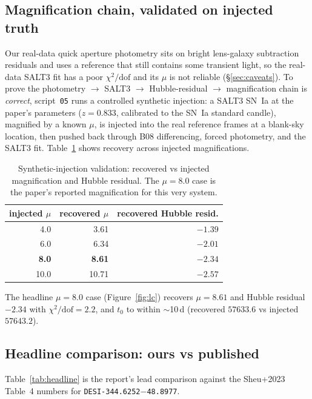 \documentclass[11pt,letterpaper]{article}
\newcommand{\muamp}{\ensuremath{\mu}}
\newcommand{\target}{\texttt{DESI-344.6252$-$48.8977}}
\begin{document}
\subsection{Magnification chain, validated on injected truth}
\label{sec:synth}
Our real-data quick aperture photometry sits on bright lens-galaxy
subtraction residuals and uses a reference that still contains some
transient light, so the real-data SALT3 fit has a poor $\chi^2/\mathrm{dof}$
and its $\muamp$ is not reliable (\S\ref{sec:caveats}). To prove the
photometry $\to$ SALT3 $\to$ Hubble-residual $\to$ magnification chain is
\emph{correct}, script~\texttt{05} runs a controlled synthetic injection: a
SALT3 SN~Ia at the paper's parameters ($z=0.833$, calibrated to the SN~Ia
standard candle), magnified by a known $\muamp$, is injected into the real
reference frames at a blank-sky location, then pushed back through B08
differencing, forced photometry, and the SALT3 fit. Table~\ref{tab:synth}
shows recovery across injected magnifications.

\begin{table}[ht]
\centering
\caption{Synthetic-injection validation: recovered vs injected
magnification and Hubble residual. The $\muamp=8.0$ case is the paper's
reported magnification for this very system.}
\label{tab:synth}
\begin{tabular}{rrr}
\toprule
injected $\muamp$ & recovered $\muamp$ & recovered Hubble resid. \\
\midrule
4.0          & 3.61          & $-1.39$ \\
6.0          & 6.34          & $-2.01$ \\
\textbf{8.0} & \textbf{8.61} & \textbf{$-2.34$} \\
10.0         & 10.71         & $-2.57$ \\
\bottomrule
\end{tabular}
\end{table}

The headline $\muamp = 8.0$ case (Figure~\ref{fig:lc}) recovers
$\muamp = 8.61$ and Hubble residual $-2.34$ with $\chi^2/\mathrm{dof}=2.2$,
and $t_0$ to within $\sim$10\,d (recovered $57633.6$ vs injected $57643.2$).

\subsection{Headline comparison: ours vs published}
Table~\ref{tab:headline} is the report's lead comparison against the
Sheu+2023 Table~4 numbers for \target.
\end{document}

